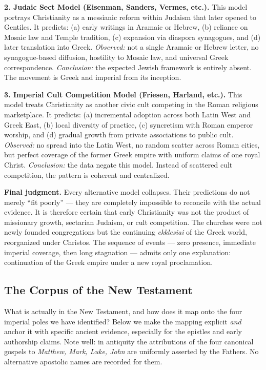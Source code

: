 \textbf{2. Judaic Sect Model (Eisenman, Sanders, Vermes, etc.).}
This model portrays Christianity as a messianic reform within Judaism that later opened to Gentiles.
It predicts: (a) early writings in Aramaic or Hebrew, (b) reliance on Mosaic law and Temple tradition, (c) expansion via diaspora synagogues, and (d) later translation into Greek.
\emph{Observed:} not a single Aramaic or Hebrew letter, no synagogue-based diffusion, hostility to Mosaic law, and universal Greek correspondence.
\emph{Conclusion:} the expected Jewish framework is entirely absent. The movement is Greek and imperial from its inception.

\textbf{3. Imperial Cult Competition Model (Friesen, Harland, etc.).}
This model treats Christianity as another civic cult competing in the Roman religious marketplace.
It predicts: (a) incremental adoption across both Latin West and Greek East, (b) local diversity of practice, (c) syncretism with Roman emperor worship, and (d) gradual growth from private associations to public cult.
\emph{Observed:} no spread into the Latin West, no random scatter across Roman cities, but perfect coverage of the former Greek empire with uniform claims of one royal Christ.
\emph{Conclusion:} the data negate this model. Instead of scattered cult competition, the pattern is coherent and centralized.

\textbf{Final judgment.}
Every alternative model collapses.
Their predictions do not merely “fit poorly” — they are completely impossible to reconcile with the actual evidence.
It is therefore certain that early Christianity was not the product of missionary growth, sectarian Judaism, or cult competition.
The churches were not newly founded congregations but the continuing \textit{ekklesiai} of the Greek world, reorganized under Christos.
The sequence of events — zero presence, immediate imperial coverage, then long stagnation — admits only one explanation: continuation of the Greek empire under a new royal proclamation.

\subsection{The Corpus of the New Testament}\label{subsec:the-corpus-of-the-new-testament}

What is actually in the New Testament, and how does it map onto the four imperial poles we have identified?
Below we make the mapping explicit \emph{and} anchor it with specific ancient evidence, especially for the epistles and early authorship claims.
Note well: in antiquity the attributions of the four canonical gospels to \textit{Matthew, Mark, Luke, John} are uniformly asserted by the Fathers.
No alternative apostolic names are recorded for them.

